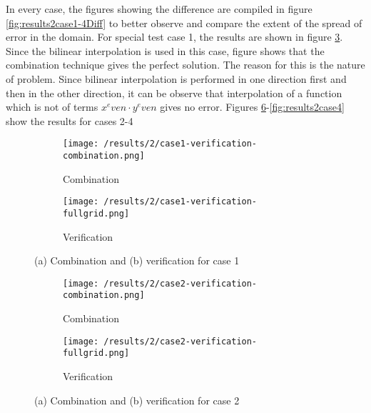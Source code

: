 In every case, the figures showing the difference are compiled in figure \ref{fig:results2case1-4Diff} to better observe and compare the extent of the spread of error in the domain. For special test case 1, the results are shown in figure \ref{fig:results2case1}. Since the bilinear interpolation is used in this case, figure shows that the combination technique gives the perfect solution. The reason for this is the nature of problem. Since bilinear interpolation is performed in one direction first and then in the other direction, it can be observe that interpolation of a function which is not of terms $x^even \cdot y^even$ gives no error. Figures \ref{fig:results2case2}-\ref{fig:results2case4} show the results for cases 2-4
\begin{figure}[h]
	\centering
    \begin{subfigure}[b]{0.49\textwidth}
	    \texttt{[image: /results/2/case1-verification-combination.png]}
		\centering
        \caption{Combination}
        \label{fig:results2case1Combi}
    \end{subfigure} 
    \begin{subfigure}[b]{0.49\textwidth}    
	    \texttt{[image: /results/2/case1-verification-fullgrid.png]}
		\centering    
		 \caption{Verification}
	    \label{fig:results2case1Full}	 
    \end{subfigure} 
    \caption{(a) Combination and (b) verification for case 1}
    \label{fig:results2case1}
\end{figure}
\begin{figure}[h]
	\centering
    \begin{subfigure}[b]{0.49\textwidth}
	    \texttt{[image: /results/2/case2-verification-combination.png]}
		\centering
        \label{fig:results2case2Combi}
        \caption{Combination}
    \end{subfigure} 
    \begin{subfigure}[b]{0.49\textwidth}    
	    \texttt{[image: /results/2/case2-verification-fullgrid.png]}
		\centering    
	 \caption{Verification}
	    \label{fig:results2case2Full}	 	 
    \end{subfigure} 
    \caption{(a) Combination and (b) verification for case 2}
    \label{fig:results2case2}
\end{figure}

